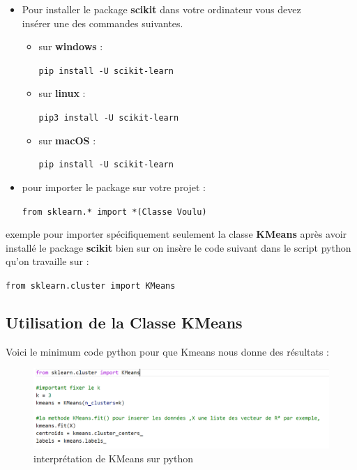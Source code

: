 \documentclass[a4paper,12pt]{report}
\begin{document}
\begin{itemize}
    \item Pour installer le package \textbf{scikit} dans votre ordinateur vous devez \\insérer une des commandes suivantes.\\ 
    \begin{itemize}
        \item sur \textbf{windows} : 
            \begin{center}
                \texttt{pip install -U scikit-learn}
            \end{center}
        \item sur \textbf{linux} :
            \begin{center}
                \texttt{pip3 install -U scikit-learn}
            \end{center}
        \item sur \textbf{macOS} :
            \begin{center}
                \texttt{pip install -U scikit-learn}
            \end{center}
    \end{itemize}
    
    \item pour importer le package sur votre projet : 
    \begin{center}
        \texttt{from sklearn.* import *(Classe Voulu)}
    \end{center}
\end{itemize}

exemple pour importer spécifiquement seulement la classe \textbf{KMeans} après avoir installé le package \textbf{scikit} bien sur on insère le code suivant dans le script python qu'on travaille sur :
\begin{center}
        \texttt{from sklearn.cluster import KMeans}
\end{center}

\subsection{Utilisation de la Classe KMeans}
Voici le minimum code python pour que Kmeans nous donne des résultats :\\

\begin{figure}[ht]
    \centering
    \includegraphics[width=1.2\textwidth]{etapes light.PNG}
    \caption{interprétation de KMeans sur python }
    \label{fig:kmeans etapes}
\end{figure}
\end{document}

